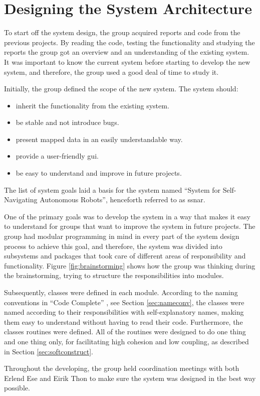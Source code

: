 \section{Designing the System Architecture}
To start off the system design, the group acquired reports and code from the previous projects. By reading the code, testing the functionality and studying the reports the group got an overview and an understanding of the existing system. It was important to know the current system before starting to develop the new system, and therefore, the group used a good deal of time to study it.

Initially, the group defined the scope of the new system. The system should:
\begin{itemize}
    \item inherit the functionality from the existing system.
    \item be stable and not introduce bugs.
    \item present mapped data in an easily understandable way.
    \item provide a user-friendly \acrshort{gui}.
    \item be easy to understand and improve in future projects.
\end{itemize}
The list of system goals laid a basis for the system named ``System for Self-Navigating Autonomous Robots'', henceforth referred to as \acrshort{ssnar}.

One of the primary goals was to develop the system in a way that makes it easy to understand for groups that want to improve the system in future projects. The group had modular programming in mind in every part of the system design process to achieve this goal, and therefore, the system was divided into subsystems and packages that took care of different areas of responsibility and functionality. Figure \ref{fig:brainstorming} shows how the group was thinking during the brainstorming, trying to structure the responsibilities into modules. 

Subsequently, classes were defined in each module. According to the naming conventions in ``Code Complete'' \cite{stevemcconnell2004}, see Section \ref{sec:nameconv}, the classes were named according to their responsibilities with self-explanatory names, making them easy to understand without having to read their code. Furthermore, the classes routines were defined. All of the routines were designed to do one thing and one thing only, for facilitating high cohesion and low coupling, as described in Section \ref{sec:softconstruct}.

Throughout the developing, the group held coordination meetings with both Erlend Ese and Eirik Thon to make sure the system was designed in the best way possible.
